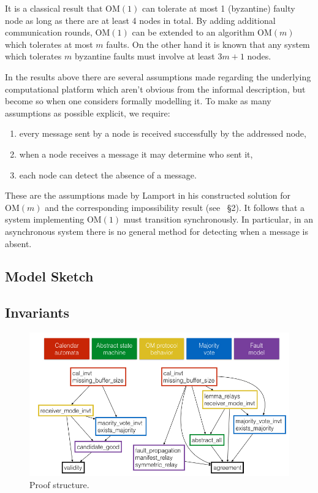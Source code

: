 \documentclass{llncs/llncs}
\newcommand{\OM}[1]{\ensuremath{\mathrm{OM}(#1)}}
\begin{document}
It is a classical result that \OM{1} can tolerate at most 1 (byzantine) faulty
node as long as there are at least 4 nodes in total. By adding additional
communication rounds, \OM{1} can be extended to an algorithm \OM{m} which
tolerates at most $m$ faults. On the other hand it is known that any system
which tolerates $m$ byzantine faults must involve at least $3m+1$ nodes.

In the results above there are several assumptions made regarding the
underlying computational platform which aren't obvious from the informal
description, but become so when one considers formally modelling it. To make
as many assumptions as possible explicit, we require:
\begin{enumerate}
    \item every message sent by a node is received successfully by the
        addressed node,
    \item when a node receives a message it may determine who sent it,
    \item each node can detect the absence of a message.
\end{enumerate}
These are the assumptions made by Lamport in his constructed solution for
$\OM{m}$ and the corresponding impossibility result (see
\cite{Lamport-OM}~\S2). It follows that a system implementing $\OM{1}$ must
transition synchronously. In particular, in an asynchronous system there is no
general method for detecting when a message is absent.

\subsection{Model Sketch}

\subsection{Invariants}

\begin{figure}
  \centering
  \includegraphics[width=\textwidth]{figs/proof-structure}
  \caption{Proof structure.}
  \label{fig:proof}
\end{figure}
\end{document}

